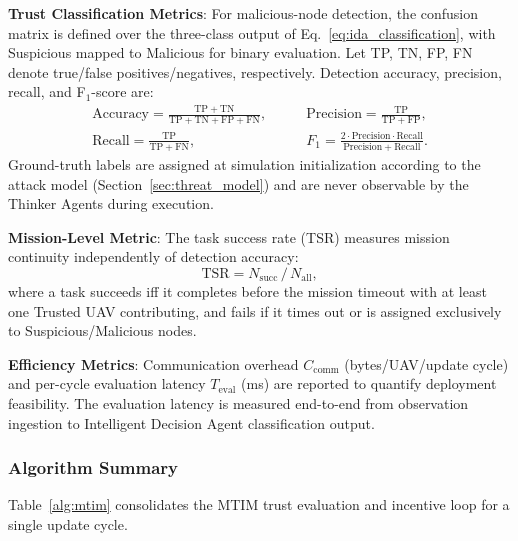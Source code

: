 \documentclass[notspecified,article,submit,moreauthors]{Definitions/mdpi}
\begin{document}
\textbf{Trust Classification Metrics}: For malicious-node detection, the confusion matrix is defined over the three-class output of Eq.~\ref{eq:ida_classification}, with Suspicious mapped to Malicious for binary evaluation. Let TP, TN, FP, FN denote true/false positives/negatives, respectively. Detection accuracy, precision, recall, and F$_1$-score are:
\begin{equation}\label{eq:accuracy}
\begin{aligned}
\mathrm{Accuracy} = \frac{\mathrm{TP} + \mathrm{TN}}{\mathrm{TP} + \mathrm{TN} + \mathrm{FP} + \mathrm{FN}},
&\qquad
\mathrm{Precision} = \frac{\mathrm{TP}}{\mathrm{TP} + \mathrm{FP}},
\\
\mathrm{Recall} = \frac{\mathrm{TP}}{\mathrm{TP} + \mathrm{FN}},
&\qquad
F_1 = \frac{2 \cdot \mathrm{Precision} \cdot \mathrm{Recall}}{\mathrm{Precision} + \mathrm{Recall}}.
\end{aligned}
\end{equation}
Ground-truth labels are assigned at simulation initialization according to the attack model (Section~\ref{sec:threat_model}) and are never observable by the Thinker Agents during execution.

\textbf{Mission-Level Metric}: The task success rate (TSR) measures mission continuity independently of detection accuracy:
\begin{equation}\label{eq:tsr}
\mathrm{TSR} = N_{\mathrm{succ}} \,/\, N_{\mathrm{all}},
\end{equation}
where a task succeeds iff it completes before the mission timeout with at least one Trusted UAV contributing, and fails if it times out or is assigned exclusively to Suspicious/Malicious nodes.

\textbf{Efficiency Metrics}: Communication overhead $C_{\text{comm}}$ (bytes/UAV/update cycle) and per-cycle evaluation latency $T_{\text{eval}}$ (ms) are reported to quantify deployment feasibility. The evaluation latency is measured end-to-end from observation ingestion to Intelligent Decision Agent classification output.

\subsubsection{Algorithm Summary}
Table~\ref{alg:mtim} consolidates the MTIM trust evaluation and incentive loop for a single update cycle.
\end{document}
